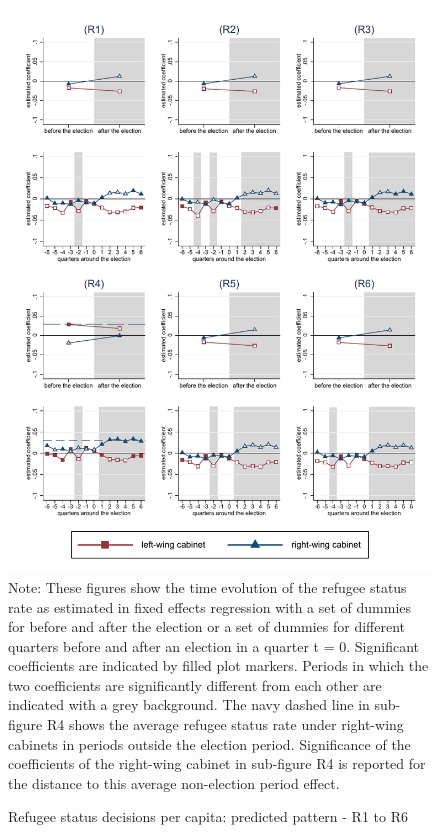 \documentclass[11pt,a4paper]{scrartcl}
\begin{document}
\clearpage
\FloatBarrier
\begin{figure}[!ht]
	\caption{Refugee status decisions per capita: predicted pattern - R1 to R6}
	\includegraphics[width=1\textwidth]{../results/decisions/refugeestatus_rate_graphs_R1-R6.pdf}
	\scriptsize{Note: These figures show the time evolution of the refugee status rate as estimated in fixed effects regression with a set of dummies for before and after the election or a set of dummies for different quarters before and after an election in a quarter t = 0. Significant coefficients are indicated by filled plot markers. Periods in which the two coefficients are significantly different from each other are indicated with a grey background. The navy dashed line in sub-figure R4 shows the average refugee status rate under right-wing cabinets in periods outside the election period. Significance of the coefficients of the right-wing cabinet in sub-figure R4 is reported for the distance to this average non-election period effect.}
\end{figure}
\end{document}

